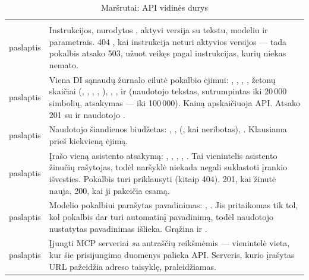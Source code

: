 \begin{xltabular}{\textwidth}{@{}L{19mm}Y@{}}
\caption{Maršrutai: API vidinės durys}\label{tab:api:door-django}\\
\toprule {} &  \\ \midrule \endfirsthead
\toprule {} &  \\ \midrule \endhead
\bottomrule \endlastfoot
{}
paslaptis & Instrukcijos, nurodytos , aktyvi versija su tekstu, modeliu ir
  parametrais. 404 , kai instrukcija neturi aktyvios versijos ---
  tada pokalbis atsako 503, užuot veikęs pagal instrukcijas, kurių niekas nemato. \\
\addlinespace
{}
paslaptis & Viena DI sąnaudų žurnalo eilutė pokalbio ėjimui: , ,
  , , žetonų skaičiai (,
  , , ,
  ), , ,  ir
   (naudotojo tekstas, sutrumpintas iki 20\,000 simbolių, atsakymas --- iki
  100\,000). Kainą apskaičiuoja API. Atsako 201 su  ir naudotojo . \\
\addlinespace
{}
paslaptis & Naudotojo  šiandienos biudžetas: , ,
   (, kai neribotas), . Klausiama prieš kiekvieną ėjimą. \\
\addlinespace
{}
paslaptis & Įrašo vieną asistento atsakymą: , , ,
  , . Tai vienintelis asistento žinučių rašytojas, todėl naršyklė
  niekada negali suklastoti įrankio išvesties. Pokalbis turi priklausyti  (kitaip
  404). 201, kai žinutė nauja, 200, kai ji pakeičia esamą. \\
\addlinespace
{}
paslaptis & Modelio pokalbiui parašytas pavadinimas: , . Jis
  pritaikomas tik tol, kol pokalbis dar turi automatinį pavadinimą, todėl naudotojo nustatytas
  pavadinimas išlieka. Grąžina  ir . \\
\addlinespace
{}
paslaptis & Įjungti MCP serveriai \emph{su} antraščių reikšmėmis --- vienintelė vieta, kur šie
  prisijungimo duomenys palieka API. Serveris, kurio įrašytas URL pažeidžia adreso taisyklę,
  praleidžiamas. \\
\end{xltabular}

